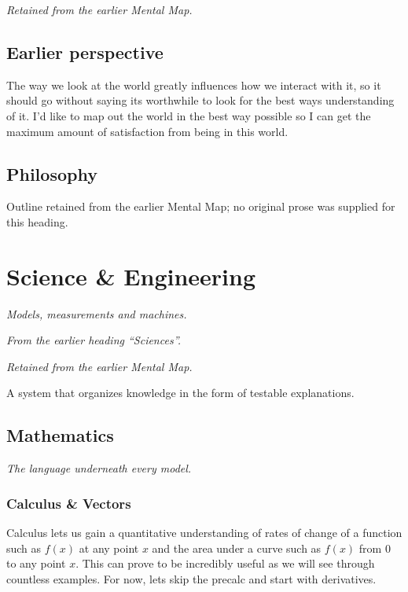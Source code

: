 \documentclass{article}
\begin{document}
\textit{Retained from the earlier Mental Map.}

\subsection*{Earlier perspective}
The way we look at the world greatly influences how we interact with it, so it should go without saying its worthwhile to look for the best ways understanding of it. I'd like to map out the world in the best way possible so I can get the maximum amount of satisfaction from being in this world. 

\newpage

\subsection*{Philosophy}
Outline retained from the earlier Mental Map; no original prose was supplied for this heading.

\section{Science \& Engineering}\label{sec:science-and-engineering}
\textit{Models, measurements and machines.}

\textit{From the earlier heading ``Sciences''.}

\textit{Retained from the earlier Mental Map.}


A system that organizes knowledge in the form of testable explanations. 

\subsection{Mathematics}\label{sec:mathematics}
\textit{The language underneath every model.}

\subsubsection{Calculus \& Vectors}\label{sec:calculus-and-vectors}

Calculus lets us gain a quantitative understanding of rates of change of a function such as \begin{math} f(x) \end{math} at any point \begin{math} x \end{math} and the area under a curve such as \begin{math} f(x) \end{math} from \begin{math} 0 \end{math} to any point \begin{math} x \end{math}. This can prove to be incredibly useful as we will see through countless examples. For now, lets skip the precalc and start with derivatives.
\end{document}
